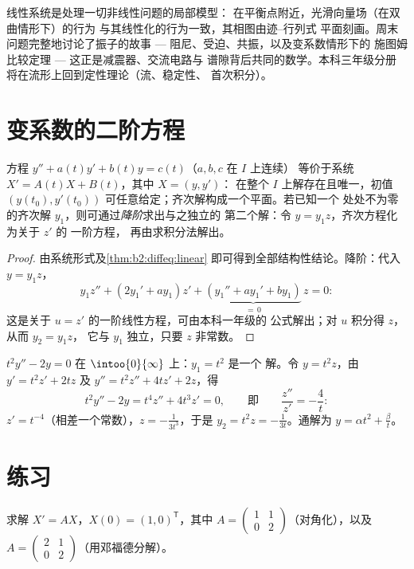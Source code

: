 \begin{remark}[应用]
线性系统是处理一切非线性问题的局部模型：
在平衡点附近，光滑向量场（在双曲情形下）的行为
与其线性化的行为一致，其相图由迹--行列式
平面刻画。周末问题完整地讨论了振子的故事 ---
阻尼、受迫、共振，以及变系数情形下的
施图姆比较定理 ---
这正是减震器、交流电路与
谱隙背后共同的数学。本科三年级分册
将在流形上回到定性理论（流、稳定性、
首次积分）。
\end{remark}

\section{变系数的二阶方程}

\begin{proposition}\label{prop:b2:diffeq:secondorder}
方程 $y'' + a(t)y' + b(t)y = c(t)$（$a, b, c$ 在 $I$ 上连续）
等价于系统 $X' = A(t)X + B(t)$，其中 $X = (y, y')$：
在整个 $I$ 上解存在且唯一，初值 $(y(t_0),
y'(t_0))$ 可任意给定；齐次解构成一个平面。若已知一个
处处不为零的齐次解 $y_1$，则可通过\emph{降阶}求出与之独立的
第二个解：令 $y = y_1 z$，齐次方程化为关于 $z'$ 的
一阶方程，
再由求积分法解出。
\end{proposition}

\begin{proof}
由系统形式及\cref{thm:b2:diffeq:linear}
即可得到全部结构性结论。降阶：代入 $y = y_1z$，
\[
y_1 z'' + (2y_1' + a y_1)z' + \underbrace{(y_1'' + ay_1' +
by_1)}_{=\,0}\,z = 0 :
\]
这是关于 $u = z'$ 的一阶线性方程，可由本科一年级的
公式解出；对 $u$ 积分得 $z$，从而 $y_2 = y_1 z$，
它与 $y_1$ 独立，只要 $z$ 非常数。
\end{proof}

\begin{example}\label{ex:b2:diffeq:lowering}
$t^2y'' - 2y = 0$ 在 $\intoo{0}{\infty}$ 上：$y_1 = t^2$ 是一个
解。令 $y = t^2z$，由 $y' = t^2z' + 2tz$ 及 $y''
= t^2z'' + 4tz' + 2z$，得
\[
t^2y'' - 2y = t^4 z'' + 4t^3z' = 0,
\qquad\text{即}\qquad \frac{z''}{z'} = -\frac4t :
\]
$z' = t^{-4}$（相差一个常数），$z = -\frac{1}{3t^3}$，于是 $y_2
= t^2z = -\frac{1}{3t}$。通解为 $y = \alpha t^2 +
\frac{\beta}{t}$。
\end{example}

\section{练习}

\begin{exercise}[$\star$]\label{exo:b2:diffeq:1}
求解 $X' = AX$，$X(0) = (1, 0)^{\mathsf T}$，其中 $A =
\begin{pmatrix} 1 & 1\\ 0 & 2\end{pmatrix}$（对角化），以及 $A =
\begin{pmatrix} 2 & 1\\ 0 & 2 \end{pmatrix}$（用邓福德分解）。
\end{exercise}


